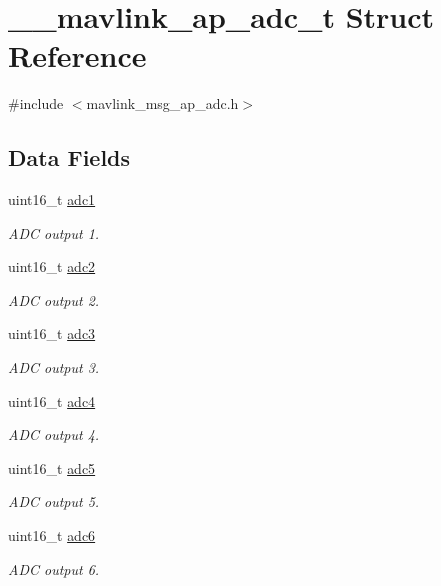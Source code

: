\hypertarget{struct____mavlink__ap__adc__t}{\section{\+\_\+\+\_\+mavlink\+\_\+ap\+\_\+adc\+\_\+t Struct Reference}
\label{struct____mavlink__ap__adc__t}
}


{\ttfamily \#include $<$mavlink\+\_\+msg\+\_\+ap\+\_\+adc.\+h$>$}

\subsection*{Data Fields}
\begin{DoxyCompactItemize}
\item 
uint16\+\_\+t \hyperlink{struct____mavlink__ap__adc__t_a7085b5252a619e7c4598b5d9d5e7521e}{adc1}
\begin{DoxyCompactList}\small\item\em A\+D\+C output 1. \end{DoxyCompactList}\item 
uint16\+\_\+t \hyperlink{struct____mavlink__ap__adc__t_a1bfcd34e841173584870521ab6da574e}{adc2}
\begin{DoxyCompactList}\small\item\em A\+D\+C output 2. \end{DoxyCompactList}\item 
uint16\+\_\+t \hyperlink{struct____mavlink__ap__adc__t_a413706afd9ab7702fd4214d63b93bd77}{adc3}
\begin{DoxyCompactList}\small\item\em A\+D\+C output 3. \end{DoxyCompactList}\item 
uint16\+\_\+t \hyperlink{struct____mavlink__ap__adc__t_ab56ccc48681a678795f7a3b5eea44f34}{adc4}
\begin{DoxyCompactList}\small\item\em A\+D\+C output 4. \end{DoxyCompactList}\item 
uint16\+\_\+t \hyperlink{struct____mavlink__ap__adc__t_a2b722957aacef288219075497b917bd4}{adc5}
\begin{DoxyCompactList}\small\item\em A\+D\+C output 5. \end{DoxyCompactList}\item 
uint16\+\_\+t \hyperlink{struct____mavlink__ap__adc__t_ab9eddc7e8962f119f2452783315d22ae}{adc6}
\begin{DoxyCompactList}\small\item\em A\+D\+C output 6. \end{DoxyCompactList}\end{DoxyCompactItemize}


